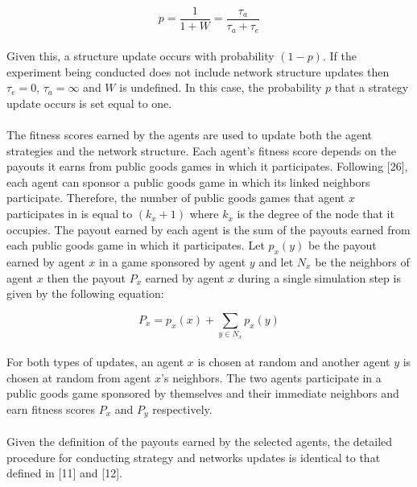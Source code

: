\documentclass{article}
\begin{document}
	\begin{equation}
	p=\frac{1}{1+W}=\frac{\tau_a}{\tau_a+\tau_e}	
	\end{equation}

	\paragraph{}Given this, a structure update occurs with probability $(1-p)$.  If the experiment being conducted does not include network structure updates then $\tau_e=0$, $\tau_a=\infty$ and $W$ is undefined.  In this case, the probability $p$ that a strategy update occurs is set equal to one.
	\paragraph{}The fitness scores earned by the agents are used to update both the agent strategies and the network structure.  Each agent's fitness score depends on the payouts it earns from public goods games in which it participates.  Following [26], each agent can sponsor a public goods game in which its linked neighbors participate.  Therefore, the number of public goods games that agent $x$ participates in is equal to $(k_x+1)$ where $k_x$ is the degree of the node that it occupies.  The payout earned by each agent is the sum of the payouts earned from each public goods game in which it participates.  Let $p_x(y)$ be the payout earned by agent $x$ in a game sponsored by agent $y$ and let $N_x$ be the neighbors of agent $x$ then the payout $P_x$ earned by agent $x$ during a single simulation step is given by the following equation:

	\begin{equation}
	P_x=p_x(x)+\sum_{y \in N_x} p_x(y)
	\end{equation}

	\paragraph{}For both types of updates, an agent $x$ is chosen at random and another agent $y$ is chosen at random from agent $x$'s neighbors.  The two agents participate in a public goods game sponsored by themselves and their immediate neighbors and earn fitness scores $P_x$ and $P_y$ respectively.
	\paragraph{}Given the definition of the payouts earned by the selected agents, the detailed procedure for conducting strategy and networks updates is identical to that defined in [11] and [12].
\end{document}
